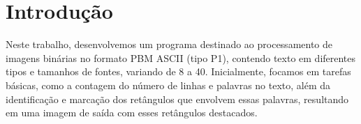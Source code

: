 \documentclass[english, 
               brazil, 
               bsc] %
               {dcomp-abntex2}
\begin{document}




\frenchspacing 








\pretextual








\orientador{}
\coorientador{}














%
%
\imprimircapa
%  
%     
\mostrarSUMARIO








\textual




\chapter{Introdução} \label{introduction}


Neste trabalho, desenvolvemos um programa destinado ao processamento de imagens binárias no formato PBM ASCII (tipo P1), contendo texto em diferentes tipos e tamanhos de fontes, variando de 8 a 40. Inicialmente, focamos em tarefas básicas, como a contagem do número de linhas e palavras no texto, além da identificação e marcação dos retângulos que envolvem essas palavras, resultando em uma imagem de saída com esses retângulos destacados.
\end{document}
